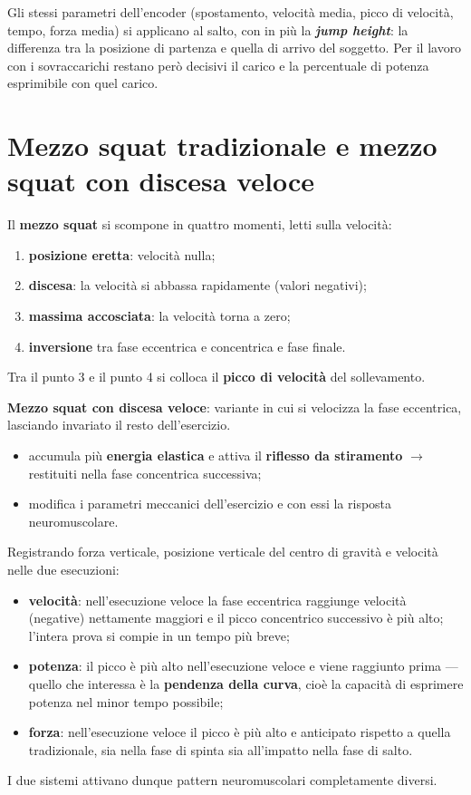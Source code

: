 Gli stessi parametri dell'encoder (spostamento, velocità media, picco di velocità, tempo, forza
media) si applicano al salto, con in più la \textbf{\textit{jump height}}: la differenza tra la
posizione di partenza e quella di arrivo del soggetto. Per il lavoro con i sovraccarichi restano
però decisivi il carico e la percentuale di potenza esprimibile con quel carico.

\section{Mezzo squat tradizionale e mezzo squat con discesa veloce}

Il \textbf{mezzo squat} si scompone in quattro momenti, letti sulla velocità:
\begin{enumerate}
  \item \textbf{posizione eretta}: velocità nulla;
  \item \textbf{discesa}: la velocità si abbassa rapidamente (valori negativi);
  \item \textbf{massima accosciata}: la velocità torna a zero;
  \item \textbf{inversione} tra fase eccentrica e concentrica e fase finale.
\end{enumerate}
Tra il punto 3 e il punto 4 si colloca il \textbf{picco di velocità} del sollevamento.

\textbf{Mezzo squat con discesa veloce}: variante in cui si velocizza la fase eccentrica, lasciando
invariato il resto dell'esercizio.
\begin{itemize}
  \item accumula più \textbf{energia elastica} e attiva il \textbf{riflesso da stiramento}
    $\rightarrow$ restituiti nella fase concentrica successiva;
  \item modifica i parametri meccanici dell'esercizio e con essi la risposta neuromuscolare.
\end{itemize}

Registrando forza verticale, posizione verticale del centro di gravità e velocità nelle due
esecuzioni:
\begin{itemize}
  \item \textbf{velocità}: nell'esecuzione veloce la fase eccentrica raggiunge velocità (negative)
    nettamente maggiori e il picco concentrico successivo è più alto; l'intera prova si compie in un
    tempo più breve;
  \item \textbf{potenza}: il picco è più alto nell'esecuzione veloce e viene raggiunto prima ---
    quello che interessa è la \textbf{pendenza della curva}, cioè la capacità di esprimere potenza
    nel minor tempo possibile;
  \item \textbf{forza}: nell'esecuzione veloce il picco è più alto e anticipato rispetto a quella
    tradizionale, sia nella fase di spinta sia all'impatto nella fase di salto.
\end{itemize}
I due sistemi attivano dunque pattern neuromuscolari completamente diversi.

